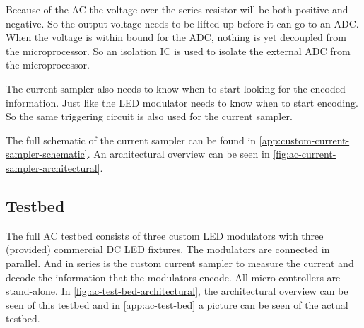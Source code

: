 Because of the AC the voltage over the series resistor will be both positive and negative.
So the output voltage needs to be lifted up before it can go to an ADC.
When the voltage is within bound for the ADC, nothing is yet decoupled from the microprocessor.
So an isolation IC is used to isolate the external ADC from the microprocessor.

The current sampler also needs to know when to start looking for the encoded information.
Just like the LED modulator needs to know when to start encoding.
So the same triggering circuit is also used for the current sampler.

The full schematic of the current sampler can be found in \autoref{app:custom-current-sampler-schematic}.
An architectural overview can be seen in \autoref{fig:ac-current-sampler-architectural}.






\subsection{Testbed}
\label{subsec:ac-testbed}

The full AC testbed consists of three custom LED modulators with three (provided) commercial DC LED fixtures.
The modulators are connected in parallel. 
And in series is the custom current sampler to measure the current and decode the information that the modulators encode.
All micro-controllers are stand-alone.
In \autoref{fig:ac-test-bed-architectural}, the architectural overview can be seen of this testbed and in \autoref{app:ac-test-bed} a picture can be seen of the actual testbed.




